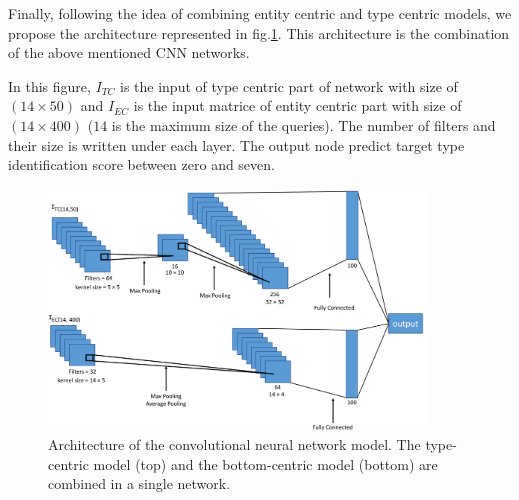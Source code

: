Finally, following the idea of combining entity centric and type centric models\cite{Balog:2011:QME:2037661.2037667,Garigliotti:2017:TTI:3077136.3080659}, we propose the architecture represented in fig.\ref{proposeModel}. This architecture is the combination of the above mentioned CNN networks.

In this figure, $I_{TC}$ is the input of type centric part of network with size of $(14\times50)$ and $I_{EC}$ is the input matrice of entity centric part with size of $(14\times400)$ ($14$ is the maximum size of the queries). The number of filters and their size is written under each layer. The output node predict target type identification score between zero and seven.

\begin{figure}
	\includegraphics[width=0.9\textwidth]{1111modelFinalVisualize.pdf} \caption{Architecture of the convolutional neural network model. The type-centric model (top) and the bottom-centric model (bottom) are combined in a single network.}
	\label{proposeModel}
\end{figure}
